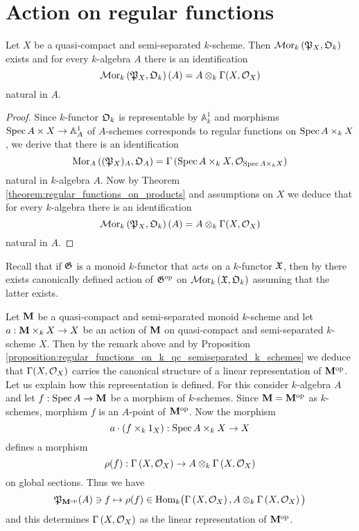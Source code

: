 \section{Action on regular functions}

\begin{proposition}\label{proposition:regular_functions_on_k_qc_semiseparated_k_schemes}
Let $X$ be a quasi-compact and semi-separated $k$-scheme. Then $\mathcal{M}\mathrm{or}_k\left({\mathfrak P}_X,{\mathfrak O}_k\right)$ exists and for every $k$-algebra $A$ there is an identification
$$\mathcal{M}\mathrm{or}_k\left({\mathfrak P}_X,{\mathfrak O}_k\right)(A) =  A\otimes_k\Gamma(X,{\mathcal O}_X)$$
natural in $A$.
\end{proposition}
\begin{proof}
Since $k$-functor ${\mathfrak O}_k$ is representable by $\mathbb{A}^1_k$ {\cite[Fact 3.2]{Monoid_k_functors}} and morphisms $\mathrm{Spec}\, A\times X\rightarrow \mathbb{A}^1_A$ of $A$-schemes corresponds to regular functions on $\mathrm{Spec}\, A \times_k X$, we derive that there is an identification
$$\mathrm{Mor}_A\left(({\mathfrak P}_X)_A,{\mathfrak O}_A\right) = \Gamma\left(\mathrm{Spec}\, A\times_k X,{\mathcal O}_{\mathrm{Spec}\, A\times_k X}\right)$$
natural in $k$-algebra $A$. Now by Theorem \ref{theorem:regular_functions_on_products} and assumptions on $X$ we deduce that for every $k$-algebra there is an identification
$$\mathcal{M}\mathrm{or}_k\left({\mathfrak P}_X,{\mathfrak O}_k\right)(A) =  A\otimes_k\Gamma(X,{\mathcal O}_X)$$
natural in $A$.
\end{proof}
\noindent
Recall that if ${\mathfrak G}$ is a monoid $k$-functor that acts on a $k$-functor ${\mathfrak X}$, then by {\cite[Proposition 10.2]{Monoid_k_functors}} there exists canonically defined action of ${\mathfrak G}^{\mathrm{op}}$ on $\mathcal{M}\mathrm{or}_k\left({\mathfrak X},{\mathfrak O}_k\right)$ assuming that the latter exists.

\begin{example}\label{example:k_monoid_action_on_regular_functions}
Let $\mathbf{M}$ be a quasi-compact and semi-separated monoid $k$-scheme and let $a:\mathbf{M}\times_kX\rightarrow X$ be an action of $\mathbf{M}$ on quasi-compact and semi-separated $k$-scheme $X$. Then by the remark above and by Proposition \ref{proposition:regular_functions_on_k_qc_semiseparated_k_schemes} we deduce that $\Gamma(X,{\mathcal O}_X)$ carries the canonical structure of a linear representation of $\mathbf{M}^{\mathrm{op}}$. Let us explain how this representation is defined. For this consider $k$-algebra $A$ and let $f:\mathrm{Spec}\, A\rightarrow \mathbf{M}$ be a morphism of $k$-schemes. Since $\mathbf{M} = \mathbf{M}^{\mathrm{op}}$ as $k$-schemes, morphism $f$ is an $A$-point of $\mathbf{M}^{\mathrm{op}}$. Now the morphism
$$a\cdot \left(f\times_k 1_X\right):\mathrm{Spec}\, A\times_k X\rightarrow X$$
defines a morphism
$$\rho(f):\Gamma\left(X,{\mathcal O}_X\right)\rightarrow A\otimes_k \Gamma\left(X,{\mathcal O}_X\right)$$
on global sections. Thus we have
$${\mathfrak P}_{\mathbf{M}^{\mathrm{op}}}(A)\ni f\mapsto \rho(f) \in \mathrm{Hom}_k\big(\Gamma\left(X,{\mathcal O}_X\right), A\otimes_k \Gamma\left(X,{\mathcal O}_X\right)\big)$$
and this determines $\Gamma\left(X,{\mathcal O}_X\right)$ as the linear representation of $\mathbf{M}^{\mathrm{op}}$.
\end{example}

